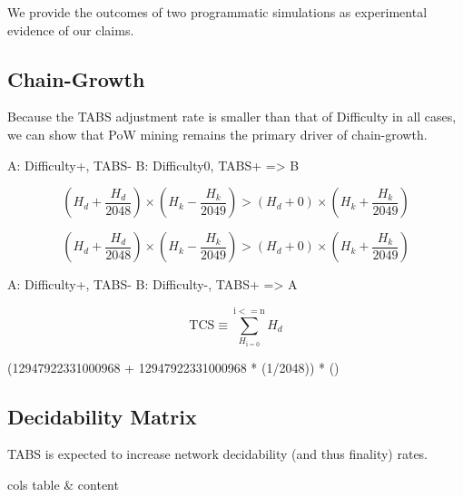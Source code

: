 \documentclass[11pt]{article}
\theoremstyle{plain}
\begin{document}
{We provide the outcomes of two programmatic simulations as experimental evidence of our claims.

\subsection{\normalsize{Chain-Growth}}

Because the TABS adjustment rate is smaller than that of Difficulty in all cases,
we can show that PoW mining remains the primary driver of chain-growth.

%
%

A: Difficulty+, TABS-
B: Difficulty0, TABS+
=> B

\begin{equation}
    (H_d + \frac{H_d}{2048}) \times (H_k - \frac{H_k}{2049}) > (H_d + 0) \times (H_k + \frac{H_k}{2049})
\end{equation}

\begin{equation}
(H_d + \frac{H_d}{2048}) \times (H_k - \frac{H_k}{2049}) > (H_d + 0) \times (H_k + \frac{H_k}{2049})
\end{equation}


A: Difficulty+, TABS-
B: Difficulty-, TABS+
=> A


\begin{equation}
    \mathrm{TCS} \equiv \sum_{H_\mathrm{i = 0}}^{\mathrm{i <= n}} H_d
\end{equation}


(12947922331000968 + 12947922331000968 * (1/2048)) * ()

\subsection{\normalsize{Decidability Matrix}}

TABS is expected to increase network decidability (and thus finality) rates.

\begin{tabular}[pos]{cols}
    table & content
\end{tabular}


}
\end{document}
